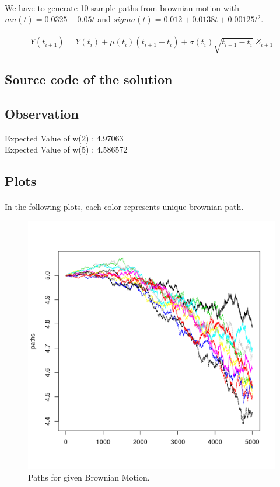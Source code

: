 \documentclass{article}
\begin{document}
	\paragraph{}
		We have to generate 10 sample paths from brownian motion with $mu(t)=0.0325-0.05t$ and $sigma(t)=0.012 + 0.0138t+0.00125{t^2}$.
	
	\paragraph{}
	\[Y(t_{i+1}) = Y(t_i)+\mu(t_i)(t_{i+1}-t_{i})+\sigma(t_i)\sqrt{t_{i+1}-t_i}.Z_{i+1}\]
		
	\subsection{Source code of the solution}
		
	
	\subsection{Observation}

	
Expected Value of w(2) :  4.97063 \\
Expected Value of w(5) :  4.586572\\
	
		\pagebreak
		\subsection{Plots}
	
		\paragraph{}
		In the following plots, each color represents unique brownian path.
		
			\begin{figure}[!ht]
  			\includegraphics[width=\linewidth]{pic/que3.png}
 			 \caption{Paths for given Brownian Motion.}
  			\label{fig:hist1_1}
		\end{figure}
		
		\clearpage
\end{document}
